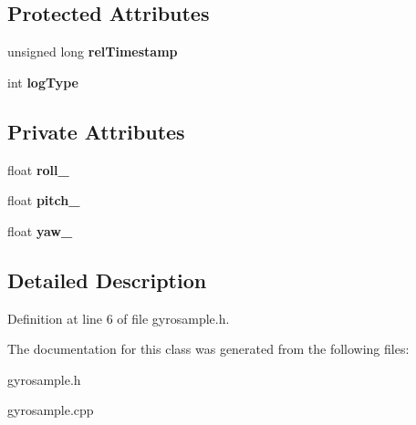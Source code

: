 \subsection*{\-Protected \-Attributes}
\begin{DoxyCompactItemize}
\item 
\hypertarget{class_sample_a24ea733ab0a815949a57aca2a4740e33}{unsigned long {\bfseries rel\-Timestamp}}\label{class_sample_a24ea733ab0a815949a57aca2a4740e33}

\item 
\hypertarget{class_sample_a3a6454628c790459f41de5c83bf3ec7c}{int {\bfseries log\-Type}}\label{class_sample_a3a6454628c790459f41de5c83bf3ec7c}

\end{DoxyCompactItemize}
\subsection*{\-Private \-Attributes}
\begin{DoxyCompactItemize}
\item 
\hypertarget{class_gyro_sample_a54e5450ba9577976cdaba4f5c2e61422}{float {\bfseries roll\-\_\-}}\label{class_gyro_sample_a54e5450ba9577976cdaba4f5c2e61422}

\item 
\hypertarget{class_gyro_sample_ad2574d31543929b4d54bf64236346bdb}{float {\bfseries pitch\-\_\-}}\label{class_gyro_sample_ad2574d31543929b4d54bf64236346bdb}

\item 
\hypertarget{class_gyro_sample_ae9454e936037dfb739b355e1baed42b5}{float {\bfseries yaw\-\_\-}}\label{class_gyro_sample_ae9454e936037dfb739b355e1baed42b5}

\end{DoxyCompactItemize}


\subsection{\-Detailed \-Description}


\-Definition at line 6 of file gyrosample.\-h.



\-The documentation for this class was generated from the following files\-:\begin{DoxyCompactItemize}
\item 
gyrosample.\-h\item 
gyrosample.\-cpp\end{DoxyCompactItemize}
